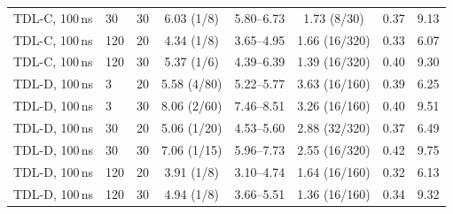 \begin{table}[!htbp]
\begin{tabular}{llcccccc}
TDL-C, 100\,ns & 30 & 30 & 6.03 (1/8) & 5.80--6.73 & 1.73 (8/30) & 0.37 & 9.13\\
TDL-C, 100\,ns & 120 & 20 & 4.34 (1/8) & 3.65--4.95 & 1.66 (16/320) & 0.33 & 6.07\\
TDL-C, 100\,ns & 120 & 30 & 5.37 (1/6) & 4.39--6.39 & 1.39 (16/320) & 0.40 & 9.30\\
\midrule
TDL-D, 100\,ns & 3 & 20 & 5.58 (4/80) & 5.22--5.77 & 3.63 (16/160) & 0.39 & 6.25\\
TDL-D, 100\,ns & 3 & 30 & 8.06 (2/60) & 7.46--8.51 & 3.26 (16/160) & 0.40 & 9.51\\
TDL-D, 100\,ns & 30 & 20 & 5.06 (1/20) & 4.53--5.60 & 2.88 (32/320) & 0.37 & 6.49\\
TDL-D, 100\,ns & 30 & 30 & 7.06 (1/15) & 5.96--7.73 & 2.55 (16/320) & 0.42 & 9.75\\
TDL-D, 100\,ns & 120 & 20 & 3.91 (1/8) & 3.10--4.74 & 1.64 (16/160) & 0.32 & 6.13\\
TDL-D, 100\,ns & 120 & 30 & 4.94 (1/8) & 3.66--5.51 & 1.36 (16/160) & 0.34 & 9.32\\
\bottomrule
\end{tabular}
\end{table}
